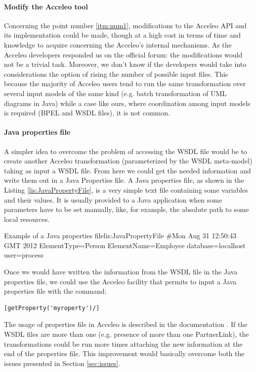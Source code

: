 \paragraph{Modify the Acceleo tool}
Concerning the point number \ref{itm:num1}, modifications to the Acceleo API and its implementation could be made, though at a high cost in terms of time and knowledge to acquire concerning the Acceleo's internal mechanisms. As the Acceleo developers responded us on the official forum: the modifications would not be a trivial task.
Moreover, we don't know if the developers would take into considerations the option of rising the number of possible input files. This because the majority of Acceleo users tend to run the same transformation over several input models of the same kind (e.g. batch transformation of UML diagrams in Java) while a case like ours, where coordination among input models is required (BPEL and WSDL files), it is not common.

\paragraph{Java properties file}
A simpler idea to overcome the problem of accessing the WSDL file would be to create another Acceleo transformation (parameterized by the WSDL meta-model) taking as input a WSDL file. From here we could get the needed information and write them out in a Java Properties file. A Java properties file, as shown in the Listing \ref{lis:JavaPropertyFile}, is a very simple text file containing some variables and their values. It is usually provided to a Java application when some parameters have to be set manually, like, for example, the absolute path to some local resources.

\begin{center}
  \begin{minipage}{1\textwidth}
    \begin{java-code}{Example of a Java properties file}{lis:JavaPropertyFile}
#Mon Aug 31 12:50:43 GMT 2012
ElementType=Person
ElementName=Employee
database=localhost
user=process
    \end{java-code}
  \end{minipage}
\end{center}

Once we would have written the information from the WSDL file in the Java properties file, we could use the Acceleo facility that permits to input a Java properties file with the command:\\
\begin{verbatim}[getProperty('myroperty')/]\end{verbatim} 
The usage of properties file in Acceleo is described in the documentation \cite{acceleoDoc}. If the WSDL files are more than one (e.g. presence of more than one PartnerLink), the transformations could be run more times attaching the new information at the end of the properties file.
This improvement would basically overcome both the issues presented in Section \ref{sec:issues}.


